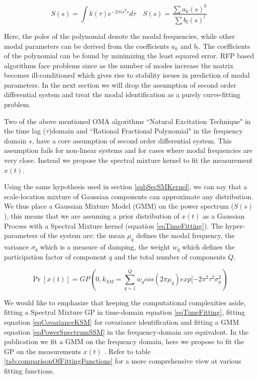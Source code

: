 \begin{equation}\label{eq:RFP}
S(s) = \int k(\tau) e^{-2 \pi is^{T} s}d\tau \quad    S(s) = \frac{\sum a_{k}(s)^{k}}{\sum b_{l}(s)^{l}}
\end{equation}

Here, the poles of the polynomial denote the modal frequencies, while other modal parameters can be derived from the coefficients \(a_{k}\) and \(b_{l}\). The coefficients of the polynomial can be found by minimizing the least squared error. RFP based algorithms face problems since as the number of modes increase the matrix becomes ill-conditioned which gives rise to stability issues in prediction of modal parameters. In the next section we will drop the assumption of second order differential system and treat the modal identification as a purely curve-fitting problem.

Two of the above mentioned OMA algorithms ``Natural Excitation Technique" in the time lag (\( \tau\))domain and ``Rational Fractional Polynomial" in the frequency domain \(s\), have a core assumption of second order differential system. This assumption fails for non-linear systems and for cases where modal frequencies are very close. Instead we propose the spectral mixture kernel to fit the measurement \(x(t)\). 

Using the same hypothesis used in section \ref{subSecSMKernel}, we can say that a scale-location mixture of Gaussian components can approximate any distribution. We thus place a Gaussian Mixture Model (GMM) on the power spectrum (\(S(s)\)), this means that we are assuming a prior distribution of \(x(t)\) as a Gaussian Process with a Spectral Mixture kernel (equation \ref{eqTimeFitting}). The hyper-parameters of the system are: the mean \(\mu_{q}\) defines the modal frequency, the variance \(\sigma_{q}\) which is a measure of damping, the weight \(w_{q}\) which defines the participation factor of component \(q\) and the total number of components \(Q\).

\begin{equation}\label{eqTimeFitting}
\Pr[x(t)] = GP(0, k_{SM} = \sum_{q=1}^{Q}w_{q}cos(2\pi\mu_{q}) exp[-2\pi^{2}\tau^{2}\sigma_{q}^2)
\end{equation}

We would like to emphasize that keeping the computational complexities aside, fitting a Spectral Mixture GP in time-domain equation \ref{eqTimeFitting}, fitting equation \ref{eqCovarianceKSM} for covariance identification and fitting a GMM equation \ref{eqPowerSpectrumSSM} in the frequency-domain are equivalent. In the publication \cite{chiplunkar2017operational} we fit a GMM on the frequency domain, here we propose to fit the GP on the measurements \(x(t)\) . Refer to table \ref{tab:comparisonOfFittingFunctions} for a more comprehensive view at various fitting functions.

